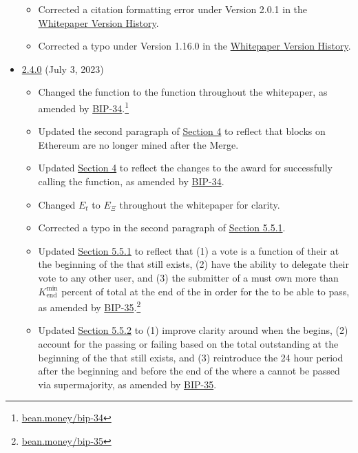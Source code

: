 \documentclass[class=article, crop=false]{standalone}
\begin{document}
\begin{itemize}[topsep=0pt, itemsep=3pt,leftmargin=16pt]
\begin{itemize}
        \item Corrected a citation formatting error under Version 2.0.1 in the \hyperlink{subsection.14.12}{Whitepaper Version History}.
        \item Corrected a typo under Version 1.16.0 in the \hyperlink{subsection.14.12}{Whitepaper Version History}.
    \end{itemize}  
    \newpage
        \item \href{https://github.com/BeanstalkFarms/Beanstalk-Whitepaper/blob/master/version-history/beanstalk2_4_0.pdf}{2.4.0} (July 3, 2023)
    \begin{itemize}
        \item Changed the  function to the  function throughout the whitepaper, as amended by \href{https://bean.money/bip-34}{BIP-34}.\footnote{\href{https://bean.money/bip-34}{bean.money/bip-34}}
        \item Updated the second paragraph of \hyperlink{section.4}{Section 4} to reflect that blocks on Ethereum are no longer mined after the Merge.
        \item Updated \hyperlink{section.4}{Section 4} to reflect the changes to the award for successfully calling the  function, as amended by \href{https://bean.money/bip-34}{BIP-34}.
        \item Changed $E_t$ to $E_\Xi$ throughout the whitepaper for clarity.
        \item Corrected a typo in the second paragraph of \hyperlink{subsubsection.5.5.1}{Section 5.5.1}.
        \item Updated \hyperlink{subsubsection.5.5.1}{Section 5.5.1} to reflect that (1) a  vote is a function of their  at the beginning of the  that still exists, (2)  have the ability to delegate their vote to any other user, and (3) the submitter of a  must own more than $K_{\text{end}}^{\text{min}}$ percent of total  at the end of the  in  order for the  to be able to pass, as amended by \href{https://bean.money/bip-35}{BIP-35}.\footnote{\href{https://bean.money/bip-35}{bean.money/bip-35}}
        \item Updated \hyperlink{subsubsection.5.5.2}{Section 5.5.2} to (1) improve clarity around when the  begins, (2) account for the  passing or failing based on the total outstanding  at the beginning of the  that still exists, and (3) reintroduce the 24 hour period after the beginning and before the end of the  where a  cannot be passed via supermajority, as amended by \href{https://bean.money/bip-35}{BIP-35}.

\end{itemize}
\end{itemize}
\end{document}

